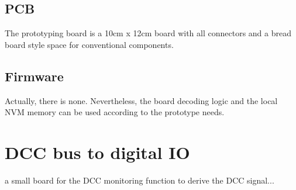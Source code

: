 
\subsection{PCB}

The prototyping board is a 10cm x 12cm board with all connectors and a bread board style space for conventional components.


\subsection{Firmware}

Actually, there is none. Nevertheless, the board decoding logic and the local NVM memory can be used according to the prototype needs.



\section{DCC bus to digital IO}

a small board for the DCC monitoring function to derive the DCC signal...


